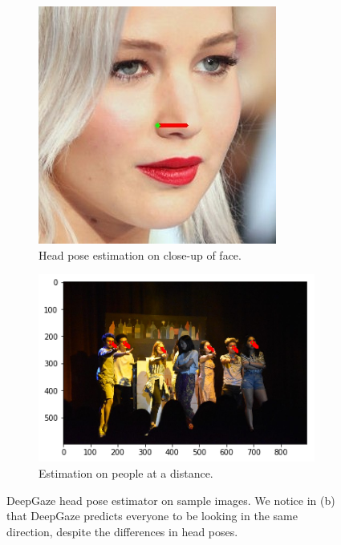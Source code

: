 \begin{figure}[ht]
	\begin{subfigure}[b]{.5\textwidth}
		\centering
		\includegraphics[width=0.675\linewidth]{img/chapter4_analysis/headPose.jpeg}
		\caption{Head pose estimation on close-up of face.}
	\end{subfigure}%
	\hspace{\fill} 
	\begin{subfigure}[b]{.5\textwidth}
		\centering
		\includegraphics[width=1.0\linewidth]{img/chapter4_analysis/deepgazeWhole.png}
		\caption{Estimation on people at a distance.}
	\end{subfigure}
	\vspace{-2\baselineskip}
	\begin{center}
		\caption{DeepGaze head pose estimator on sample images. We notice in (b) that DeepGaze predicts everyone to be looking in the same direction, despite the differences in head poses.}
		\label{fig:deepGaze}
	\end{center}
	\vspace{-2\baselineskip}
\end{figure}

